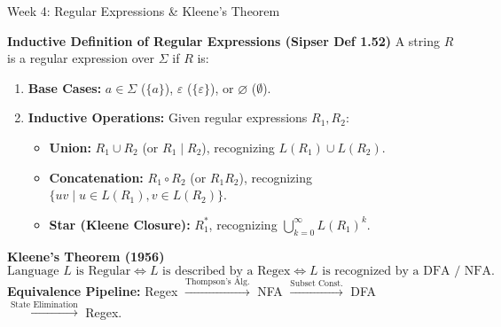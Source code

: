 \documentclass[aspectratio=169, 10pt]{beamer}
\begin{document}
\begin{frame}{Week 4: Regular Expressions \& Kleene's Theorem}
  \begin{tcolorbox}[conceptcard]
    {\bfseries\footnotesize\color{gimpanavy} Inductive Definition of Regular Expressions (Sipser Def 1.52)}
    \vspace{0.06cm}
    \footnotesize
    A string $R$ is a regular expression over $\Sigma$ if $R$ is:
    \begin{enumerate}\setlength{\itemsep}{1.5pt}
      \item \textbf{Base Cases:} $a \in \Sigma$ ($\{a\}$), $\varepsilon$ ($\{\varepsilon\}$), or $\varnothing$ ($\emptyset$).
      \item \textbf{Inductive Operations:} Given regular expressions $R_1, R_2$:
        \begin{itemize}\setlength{\itemsep}{1pt}\footnotesize
          \item \textbf{Union:} $R_1 \cup R_2$ (or $R_1 \mid R_2$), recognizing $L(R_1) \cup L(R_2)$.
          \item \textbf{Concatenation:} $R_1 \circ R_2$ (or $R_1 R_2$), recognizing $\{uv \mid u \in L(R_1), v \in L(R_2)\}$.
          \item \textbf{Star (Kleene Closure):} $R_1^*$, recognizing $\bigcup_{k=0}^{\infty} L(R_1)^k$.
        \end{itemize}
    \end{enumerate}
  \end{tcolorbox}

  \vspace{0.08cm}
  \begin{tcolorbox}[examplecard]
    {\bfseries\footnotesize\color{accentGreen} Kleene's Theorem (1956)}
    \vspace{0.04cm}
    \footnotesize
    $$\text{Language } L \text{ is Regular} \iff L \text{ is described by a Regex} \iff L \text{ is recognized by a DFA / NFA.}$$
    \vspace{-0.05cm}
    \textbf{Equivalence Pipeline:} Regex $\xrightarrow{\text{Thompson's Alg.}}$ NFA $\xrightarrow{\text{Subset Const.}}$ DFA $\xrightarrow{\text{State Elimination}}$ Regex.
  \end{tcolorbox}
\end{frame}
\end{document}

